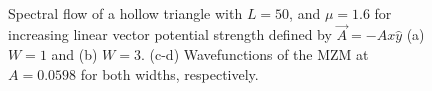 \begin{figure}[!ht]
  \\
  \caption{Spectral flow of a hollow triangle with $L=50$, and $\mu=1.6$ for increasing linear vector potential strength defined by $\vec{A} = -Ax\hat{y}$ (a) $W=1$ and (b) $W=3$. (c-d) Wavefunctions of the MZM at $A=0.0598$ for both widths, respectively.}
  \label{fig: linear-increasing-mu-1_6}
\end{figure}

